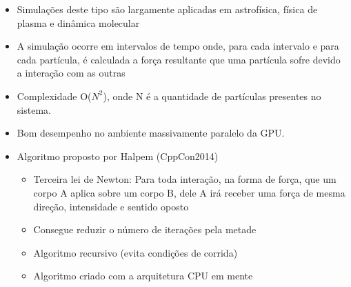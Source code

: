 \documentclass[a0paper,portrait]{baposter}
\begin{document}
\begin{poster}
{\begin{itemize}
\item Simulações deste tipo são largamente
aplicadas em astrofísica, física de plasma e dinâmica molecular

\item 
A simulação ocorre em intervalos de tempo onde, para cada intervalo e
para cada partícula, é calculada a força resultante que uma partícula
sofre devido a interação com as outras

\item Complexidade O($N^2$), onde N é a quantidade de
partículas presentes no sistema.

\item Bom desempenho no ambiente massivamente paralelo da GPU.

\item Algoritmo proposto por Halpem (CppCon2014)
\begin{itemize}
\item Terceira lei de Newton: Para toda interação, na forma de força, que um corpo A aplica sobre um corpo B, dele A irá receber uma força de mesma direção, intensidade e sentido oposto
\item Consegue reduzir o número de iterações pela metade
\item Algoritmo recursivo (evita condições de corrida)
\item Algoritmo criado com a arquitetura CPU em mente
\end{itemize}

\end{itemize}


}



\end{poster}
\end{document}
